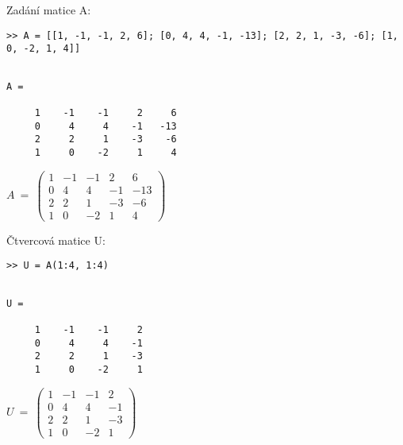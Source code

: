 \documentclass[a4paper,10pt]{article}
\begin{document}
\par Zadání matice A:

\begin{verbatim}
>> A = [[1, -1, -1, 2, 6]; [0, 4, 4, -1, -13]; [2, 2, 1, -3, -6]; [1, 0, -2, 1, 4]]
\end{verbatim}


\begin{minipage}[t]{.5\textwidth}
\begin{verbatim}

A =

     1    -1    -1     2     6
     0     4     4    -1   -13
     2     2     1    -3    -6
     1     0    -2     1     4

\end{verbatim}
\end{minipage}%
\begin{minipage}[t]{.5\textwidth}

\bigskip
\bigskip

$
A~=~
\left( \begin{array}{rrrr|r}
1 & -1 & -1 &  2 &   6 \\
0 &  4 &  4 & -1 & -13 \\
2 &  2 &  1 & -3 &  -6 \\
1 &  0 & -2 &  1 &   4 
\end{array} \right)
$

\vfill

\end{minipage}


\par Čtvercová matice U:

\begin{verbatim}
>> U = A(1:4, 1:4)
\end{verbatim}


\begin{minipage}[t]{.5\textwidth}
\begin{verbatim}

U =

     1    -1    -1     2
     0     4     4    -1
     2     2     1    -3
     1     0    -2     1 

\end{verbatim}
\end{minipage}%
\begin{minipage}[t]{.5\textwidth}

\bigskip
\bigskip

$
U~=~
\left( \begin{array}{rrrr}
1 & -1 & -1 &  2 \\
0 &  4 &  4 & -1 \\
2 &  2 &  1 & -3 \\
1 &  0 & -2 &  1 
\end{array} \right)
$

\vfill
\end{minipage}
\end{document}
